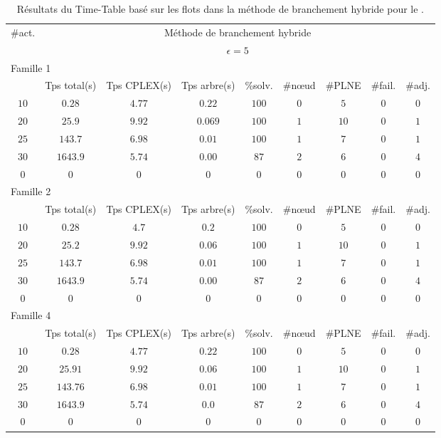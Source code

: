 \begin{table}[!htb]
  \begin{center}
    \begin{tabular}{|c|cccccccc|}
      \hline
      \#act. &  \multicolumn{8}{c|}{Méthode de branchement hybride}\\ 
             &  \multicolumn{8}{c|}{$\epsilon=5$} \\ 
      \hline 
      \multicolumn{9}{|l|}{Famille 1}\\ 
      \hline 
             & Tps total(s) & Tps CPLEX(s) & Tps arbre(s) & \%solv.  & \#n\oe ud & \#PLNE &\#fail. & \#adj. \\ 
      \hline 
      $10$ & $0.28$ & $4.77$ & $0.22$ & $100$ & $0$ & $5$ & $0$ & $0$ \\ 
      $20$ & $25.9$ & $9.92$ & $0.069$ & $100$ & $1$ & $10$ & $0$ & $1$ \\ 
      $25$ & $143.7$ & $6.98$ & $0.01$ & $100$ & $1$ & $7$ & $0$ & $1$ \\ 
      $30$ & $1643.9$ & $5.74$ & $0.00$ & $87$ & $2$ & $6$ & $0$ & $4$ \\ 
      $0$ & $0$ & $0$ & $0$ & $0$ & $0$ & $0$ & $0$ & $0$ \\ 

      \hline 	
      \multicolumn{9}{|l|}{Famille 2}\\ 
      \hline 
             & Tps total(s) & Tps CPLEX(s) & Tps arbre(s) & \%solv.  & \#n\oe ud & \#PLNE& \#fail. & \#adj. \\ 
      \hline 
      $10$ & $0.28$ & $4.7$ & $0.2$ & $100$ & $0$ & $5$ & $0$ & $0$ \\ 
      $20$ & $25.2$ & $9.92$ & $0.06$ & $100$ & $1$ & $10$ & $0$ & $1$ \\ 
      $25$ & $143.7$ & $6.98$ & $0.01$ & $100$ & $1$ & $7$ & $0$ & $1$ \\ 
      $30$ & $1643.9$ & $5.74$ & $0.00$ & $87$ & $2$ & $6$ & $0$ & $4$ \\ 
      $0$ & $0$ & $0$ & $0$ & $0$ & $0$ & $0$ & $0$ & $0$ \\ 
      
      \hline 	\multicolumn{9}{|l|}{Famille 4}\\ 
      \hline 
             & Tps total(s) & Tps CPLEX(s) & Tps arbre(s) & \%solv.  & \#n\oe ud & \#PLNE &\#fail. & \#adj. \\ 
      \hline 
      $10$ & $0.28$ & $4.77$ & $0.22$ & $100$ & $0$ & $5$ & $0$ & $0$ \\ 
      $20$ & $25.91$ & $9.92$ & $0.06$ & $100$ & $1$ & $10$ & $0$ & $1$ \\ 
      $25$ & $143.76$ & $6.98$ & $0.01$ & $100$ & $1$ & $7$ & $0$ & $1$ \\ 
      $30$ & $1643.9$ & $5.74$ & $0.0$ & $87$ & $2$ & $6$ & $0$ & $4$ \\ 
      $0$ & $0$ & $0$ & $0$ & $0$ & $0$ & $0$ & $0$ & $0$ \\ 
      \hline 
    \end{tabular}
  \end{center}
  \caption{Résultats du Time-Table basé sur les flots dans la méthode de
    branchement hybride pour le \CECSP.}
  \label{tab:res_BB_ERFlot}
\end{table}


